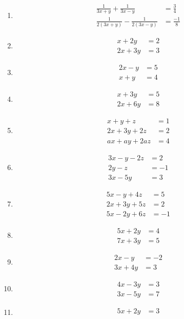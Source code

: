 \begin{multicols}{2}
\begin{enumerate}[label=\thesubsection.\arabic*,ref=\thesubsection.\theenumi]
\item
\begin{align*}
\frac{1}{3x+y}+\frac{1}{3x-y}&=\frac{3}{4}\\ \frac{1}{2(3x+y)}-\frac{1}{2(3x-y)}&=\frac{-1}{8}
\end{align*}
\item  
\begin{align*}
 x+2y &= 2\\
2x+3y &= 3
\end{align*}
\item
\begin{align*}
 2x-y &= 5\\
 x+y &= 4
\end{align*}
\item
\begin{align*}
 x+3y &= 5\\
 2x+6y&= 8
\end{align*}
\item
\begin{align*}
 x+y+z &= 1\\
 2x+3y+2z &= 2\\
 ax+ay+2az &= 4
\end{align*}
\item
\begin{align*}
 3x-y-2z &= 2\\
 2y-z &= -1\\
 3x-5y &= 3
\end{align*}
\item 
\begin{align*}
 5x-y+4z &= 5\\
 2x+3y+5z &= 2\\
 5x-2y+6z &= -1
\end{align*}
\item   
\begin{align*}
5x+2y &= 4\\
7x+3y &= 5
\end{align*}
\item 
\begin{align*}
 2x-y &= -2\\
 3x+4y &= 3
\end{align*}
\item
\begin{align*}
 4x-3y &= 3\\
 3x-5y &= 7
\end{align*}
\item
\begin{align*} 
 5x+2y &= 3\\

\end{align*}
\end{enumerate}
\end{multicols}
